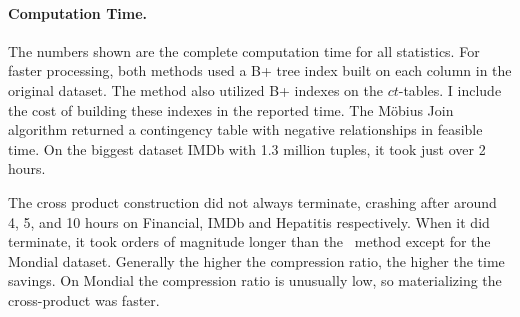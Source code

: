 \documentclass{sfuthesis}
\newcommand{\ct}{\mathit{ct}}
\begin{document}
\begin{table}[!h] \centering
\caption{Constructing the contingency table for each dataset. \\
M = million. N.T. = non-termination. Compress Ratio = CP-\#tuples/\#Statistics. \\
Computation times are given in seconds. 
  \label{table:cttimes}}

\end{table}



\paragraph{ Computation Time.} The numbers shown are the complete computation time for all statistics. For faster processing, both methods used a B+ tree index built on each column in the original dataset. The \MJ method also utilized B+ indexes on the $\ct$-tables. I  include the cost of building these indexes in the reported time. 
The M\"obius Join algorithm returned a contingency table with negative relationships in feasible time. On the biggest dataset IMDb with 1.3 million tuples, it took just over 2 hours. 


The cross product construction did not always terminate, crashing after around 4, 5, and 10 hours on Financial, IMDb and Hepatitis respectively. When it did terminate, it took orders of magnitude longer than the \MJ ~method except for the Mondial dataset. Generally the higher the compression ratio, the higher the time savings. On Mondial the compression ratio is unusually low, so materializing the cross-product was faster. 
\end{document}
